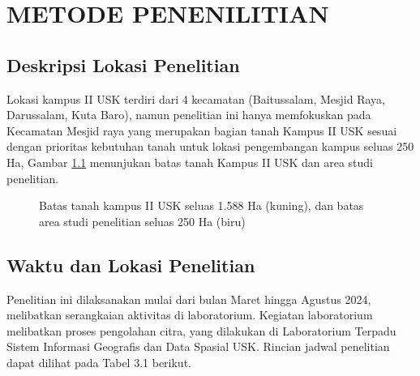 \chapter{METODE PENENILITIAN}
\section{Deskripsi Lokasi Penelitian}
Lokasi kampus II USK terdiri dari 4 kecamatan (Baitussalam, Mesjid Raya, 
Darussalam, Kuta Baro), namun penelitian ini hanya memfokuskan pada Kecamatan 
Mesjid raya yang merupakan bagian tanah Kampus II USK sesuai dengan prioritas
kebutuhan tanah untuk lokasi pengembangan kampus seluas 250 Ha, Gambar \ref{batas dan area studi} menunjukan batas tanah Kampus II USK dan area studi penelitian.

\begin{figure}[H]
\centering
{}
\caption{Batas tanah kampus II USK seluas 1.588 Ha (kuning), dan batas area studi penelitian seluas 250 Ha (biru)
}
\label{batas dan area studi}
\end{figure}

\section{Waktu dan Lokasi Penelitian}
Penelitian ini dilaksanakan mulai dari bulan Maret hingga Agustus 2024, melibatkan serangkaian aktivitas di laboratorium. Kegiatan laboratorium melibatkan proses pengolahan citra, yang dilakukan di Laboratorium Terpadu Sistem Informasi Geografis dan Data Spasial USK. Rincian jadwal penelitian dapat dilihat pada Tabel 3.1 berikut.

